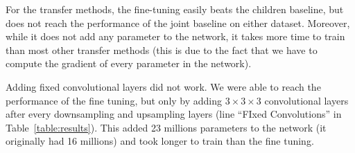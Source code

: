 


For the transfer methods, the fine-tuning easily beats the children baseline, but does not reach the performance of the joint baseline on either dataset. Moreover, while it does not add any parameter to the network, it takes more time to train than most other transfer methods (this is due to the fact that we have to compute the gradient of every parameter in the network).

Adding fixed convolutional layers did not work. We were able to reach the performance of the fine tuning, but only by adding $3 \times 3 \times 3$ convolutional layers after every downsampling and upsampling layers (line  ``FIxed Convolutions'' in Table~\ref{table:results}). This added 23 millions parameters to the network (it originally had 16 millions) and took longer to train than the fine tuning.

